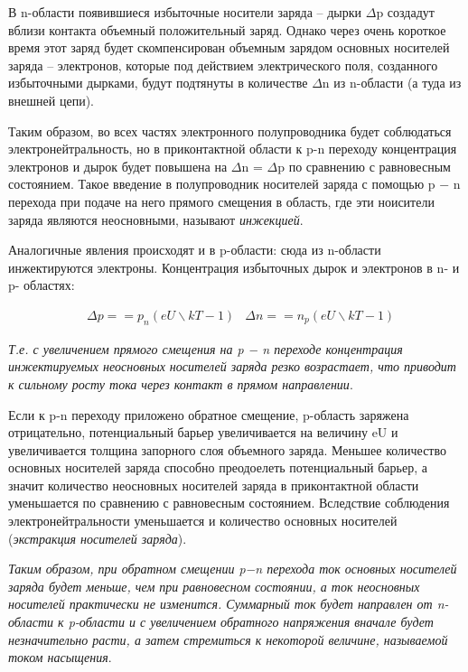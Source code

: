\documentclass[a4paper, 12pt]{article}
\begin{document}
В n-области появившиеся избыточные носители заряда – дырки $\Delta$p создадут вблизи контакта объемный положительный заряд. Однако через очень короткое время этот заряд будет скомпенсирован объемным зарядом основных носителей заряда – электронов, которые под действием электрического поля, созданного избыточными дырками, будут подтянуты в количестве $\Delta$n из n-области (а туда из внешней цепи).

Таким образом, во всех частях электронного полупроводника будет соблюдаться электронейтральность, но в приконтактной области к p-n переходу концентрация электронов и дырок будет повышена на $\Delta$n = $\Delta$p по сравнению с равновесным состоянием. Такое введение в полупроводник носителей заряда с помощью p − n перехода при подаче на него прямого смещения в область, где эти ноисители заряда являются неосновными, называют \textit{инжекцией}.

Аналогичные явления происходят и в p-области: сюда из n-области инжектируются электроны. Концентрация избыточных дырок и электронов в n- и p- областях:

\begin{align}
    & \Delta p = = p_n (eU \backslash kT - 1)
    & \Delta n = = n_p (eU \backslash kT - 1)
\end{align}

\textit{Т.е. с увеличением прямого смещения на p − n переходе концентрация инжектируемых неосновных носителей заряда резко возрастает, что приводит к сильному росту тока через контакт в прямом направлении}.

Если к p-n переходу приложено обратное смещение, p-область заряжена отрицательно, потенциальный барьер увеличивается на величину eU и увеличивается толщина запорного слоя объемного заряда. Меньшее количество основных носителей заряда способно преодоелеть потенциальный барьер, а значит количество неосновных носителей заряда в приконтактной области уменьшается по сравнению с равновесным состоянием. Вследствие соблюдения электронейтральности уменьшается и количество основных носителей (\textit{экстракция носителей заряда}).

\textit{Таким образом, при обратном смещении p−n перехода ток основных носителей заряда будет меньше, чем при равновесном состоянии, а ток неосновных носителей практически не изменится. Суммарный ток будет направлен от n-области к p-области и с увеличением обратного напряжения вначале будет незначительно расти, а затем стремиться к некоторой величине, называемой током насыщения}.
\end{document}

